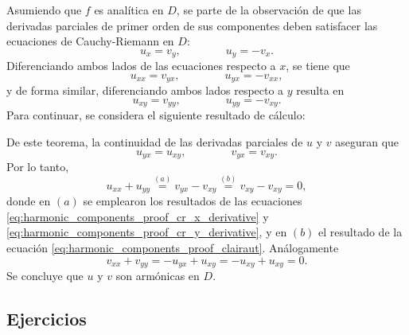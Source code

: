 \documentclass[a4paper]{report}
\begin{document}
Asumiendo que \(f\) es analítica en \(D\), se parte de la observación de que las derivadas parciales de primer orden de sus componentes deben satisfacer las ecuaciones de Cauchy-Riemann en \(D\):
\[
 u_x=v_y,
 \qquad\qquad
 u_y=-v_x.
\]
Diferenciando ambos lados de las ecuaciones respecto a \(x\), se tiene que 
\begin{equation}\label{eq:harmonic_components_proof_cr_x_derivative}
  u_{xx}=v_{yx},
 \qquad\qquad
 u_{yx}=-v_{xx},
\end{equation}
y de forma similar, diferenciando ambos lados respecto a \(y\) resulta en
\begin{equation}\label{eq:harmonic_components_proof_cr_y_derivative}
 u_{xy}=v_{yy},
 \qquad\qquad
 u_{yy}=-v_{xy}. 
\end{equation}
Para continuar, se considera el siguiente resultado de cálculo:

\medskip
\noindent
{} 

\medskip
\noindent
De este teorema, la continuidad de las derivadas parciales de \(u\) y \(v\) aseguran que
\begin{equation}\label{eq:harmonic_components_proof_clairaut}
 u_{yx}=u_{xy},
 \qquad\qquad
 v_{yx}=v_{xy}.
\end{equation}
Por lo tanto,
\[
 u_{xx}+u_{yy}\overset{(a)}{=}v_{yx}-v_{xy}\overset{(b)}{=}v_{xy}-v_{xy}=0,
\]
donde en \((a)\) se emplearon los resultados de las ecuaciones \ref{eq:harmonic_components_proof_cr_x_derivative} y \ref{eq:harmonic_components_proof_cr_y_derivative}, y en \((b)\) el resultado de la ecuación \ref{eq:harmonic_components_proof_clairaut}. Análogamente
\[
 v_{xx}+v_{yy}=-u_{yx}+u_{xy}=-u_{xy}+u_{xy}=0.
\]
Se concluye que \(u\) y \(v\) son armónicas en \(D\).

\subsection*{Ejercicios}
\end{document}
